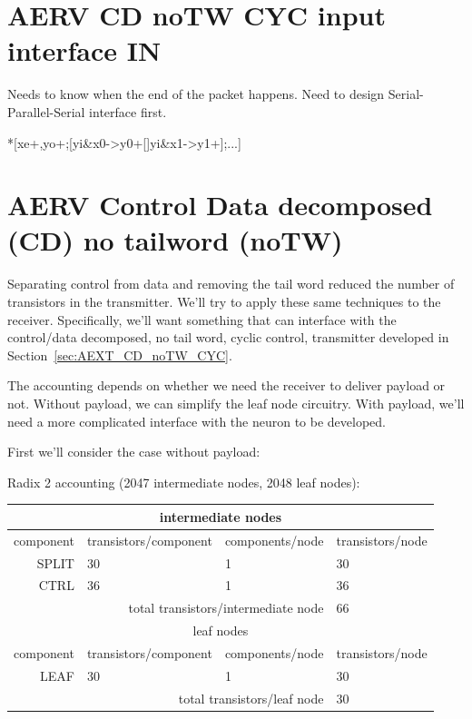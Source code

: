 \documentclass{article}
\begin{document}
\section{AERV CD noTW CYC input interface IN \label{sec:AERV_CD_noTW_CYC_IN}}

Needs to know when the end of the packet happens.
Need to design Serial-Parallel-Serial interface first.

\begin{hse}
*[xe+,yo+;[yi&x0->y0+[]yi&x1->y1+];...]
\end{hse}

\section{AERV Control Data decomposed (CD) no tailword (noTW) \label{sec:AERV_CD_noTW}}

Separating control from data and removing the tail word reduced the number of transistors in the transmitter.
We'll try to apply these same techniques to the receiver. Specifically, we'll want something that can interface with the
control/data decomposed, no tail word, cyclic control, transmitter developed in Section~\ref{sec:AEXT_CD_noTW_CYC}.

The accounting depends on whether we need the receiver to deliver payload or not.
Without payload, we can simplify the leaf node circuitry.
With payload, we'll need a more complicated interface with the neuron to be developed.

First we'll consider the case without payload:

\noindent
Radix 2 accounting (2047 intermediate nodes, 2048 leaf nodes):

\begin{center}
    \begin{tabular}{|r|l|l|l|}
    \hline \multicolumn{4}{|c|}{intermediate nodes} \\ \hline
    component & transistors/component & components/node & transistors/node \\ \hline
    SPLIT & 30 & 1 & 30 \\ \hline
    CTRL & 36 & 1 & 36 \\ \hline
    \hline \multicolumn{3}{|r|}{total transistors/intermediate node} & 66 \\ \hline
    \hline \multicolumn{4}{|c|}{leaf nodes} \\ \hline
    component & transistors/component & components/node & transistors/node \\ \hline
    LEAF & 30 & 1 & 30 \\ \hline
    \hline \multicolumn{3}{|r|}{total transistors/leaf node} & 30 \\ \hline
    \end{tabular}
\end{center}
\end{document}
